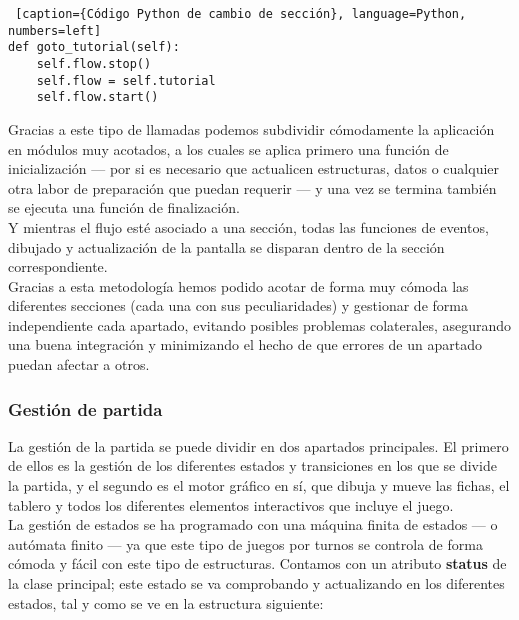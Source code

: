 \begin{lstlisting} [caption={Código Python de cambio de sección}, language=Python, numbers=left]
def goto_tutorial(self):
    self.flow.stop()
    self.flow = self.tutorial
    self.flow.start()
\end{lstlisting}

Gracias a este tipo de llamadas podemos subdividir cómodamente la aplicación en módulos muy acotados, a los cuales se aplica
primero una función de inicialización --- por si es necesario que actualicen estructuras, datos o cualquier otra labor
de preparación que puedan requerir --- y una vez se termina también se ejecuta una función de finalización. \\

Y mientras el flujo esté asociado a una sección, todas las funciones de eventos, dibujado y actualización de la pantalla
se disparan dentro de la sección correspondiente. \\

Gracias a esta metodología hemos podido acotar de forma muy cómoda las diferentes secciones (cada una con sus peculiaridades)
y gestionar de forma independiente cada apartado, evitando posibles problemas colaterales, asegurando una buena
integración y minimizando el hecho de que errores de un apartado puedan afectar a otros.

\subsubsection{Gestión de partida}

La gestión de la partida se puede dividir en dos apartados principales. El primero de ellos es la gestión de los diferentes
estados y transiciones en los que se divide la partida, y el segundo es el motor gráfico en sí, que dibuja y mueve
las fichas, el tablero y todos los diferentes elementos interactivos que incluye el juego. \\

La gestión de estados se ha programado con una máquina finita de estados --- o autómata finito --- ya que este tipo de
juegos por turnos se controla de forma cómoda y fácil con este tipo de estructuras. Contamos con un atributo \textbf{status}
de la clase principal; este estado se va comprobando y actualizando en los diferentes estados, tal y como se ve en la
estructura siguiente:

